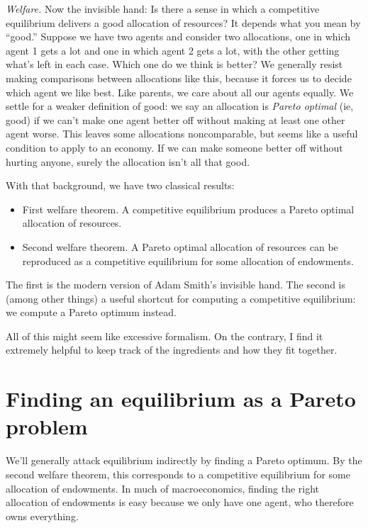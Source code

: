 \documentclass[11pt]{article}
\begin{document}
{\it Welfare.\/}  Now the invisible hand:
Is there a sense in which a competitive equilibrium delivers a
good allocation of resources?
It depends what you mean by ``good.''
Suppose we have two agents and consider two allocations,
one in which agent 1 gets a lot and one in which agent 2 gets a lot,
with the other getting what's left in each case.
Which one do we think is better?
We generally resist making comparisons between allocations like
this, because it forces us to decide which agent we like best.
Like parents, we care about all our agents equally.
We settle for a weaker definition of good:
we say an allocation is {\it Pareto optimal\/} (ie, good)
if we can't make one agent better off without making at least one
other agent worse.
This leaves some allocations noncomparable,
but seems like a useful condition to apply to an economy.
If we can make someone better off without hurting anyone,
surely the allocation isn't all that good.

With that background, we have two classical results:
%
\begin{itemize}
\item First welfare theorem.  A competitive equilibrium produces
a Pareto optimal allocation of resources.
\item Second welfare theorem.
A Pareto optimal allocation of resources can be reproduced
as a competitive equilibrium for some allocation
of endowments.
\end{itemize}
The first is the modern version of Adam Smith's invisible hand.
The second is (among other things) a useful shortcut for computing
a competitive equilibrium:  we compute a Pareto optimum instead.

All of this might seem like excessive formalism.
On the contrary, I find it extremely helpful to keep track
of the ingredients and how they fit together.


\section{Finding an equilibrium as a Pareto problem}


We'll generally attack equilibrium indirectly by finding a Pareto optimum.
By the second welfare theorem, this corresponds to a competitive equilibrium for some
allocation of endowments.
In much of macroeconomics, finding the right allocation of endowments is easy
because we only have one agent, who therefore owns everything.
\end{document}
